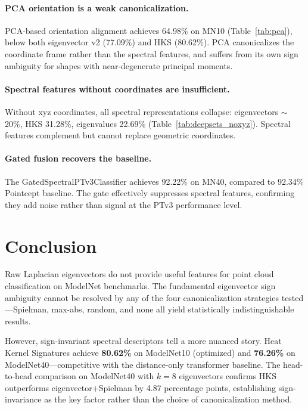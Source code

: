 \documentclass[11pt]{article}
\begin{document}
\paragraph{PCA orientation is a weak canonicalization.}
PCA-based orientation alignment achieves 64.98\% on MN10 (Table~\ref{tab:pca}), below both
eigenvector v2 (77.09\%) and HKS (80.62\%). PCA canonicalizes the coordinate frame rather
than the spectral features, and suffers from its own sign ambiguity for shapes with
near-degenerate principal moments.

\paragraph{Spectral features without coordinates are insufficient.}
Without xyz coordinates, all spectral representations collapse: eigenvectors $\sim$20\%,
HKS 31.28\%, eigenvalues 22.69\% (Table~\ref{tab:deepsets_noxyz}). Spectral features
complement but cannot replace geometric coordinates.

\paragraph{Gated fusion recovers the baseline.}
The GatedSpectralPTv3Classifier achieves 92.22\% on MN40, compared to 92.34\% Pointcept
baseline. The gate effectively suppresses spectral features, confirming they add noise
rather than signal at the PTv3 performance level.

\section{Conclusion}

Raw Laplacian eigenvectors do not provide useful features for point cloud classification
on ModelNet benchmarks. The fundamental eigenvector sign ambiguity cannot be resolved by any
of the four canonicalization strategies tested---Spielman, max-abs, random, and none all
yield statistically indistinguishable results.

However, sign-invariant spectral descriptors tell a more nuanced story. Heat Kernel
Signatures achieve \textbf{80.62\%} on ModelNet10 (optimized) and \textbf{76.26\%} on
ModelNet40---competitive with the distance-only transformer baseline. The head-to-head
comparison on ModelNet40 with $k=8$ eigenvectors confirms HKS outperforms
eigenvector+Spielman by 4.87 percentage points, establishing sign-invariance as the key
factor rather than the choice of canonicalization method.
\end{document}
